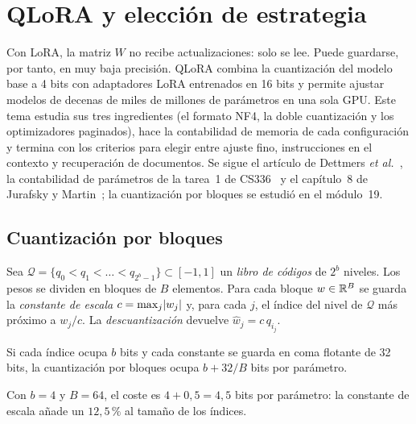 \chapter{QLoRA y elección de estrategia}
\label{tema:6}

Con LoRA, la matriz $W$ no recibe actualizaciones: solo se lee. Puede guardarse, por tanto, en muy baja precisión. QLoRA combina la cuantización del modelo base a 4 bits con adaptadores LoRA entrenados en 16 bits y permite ajustar modelos de decenas de miles de millones de parámetros en una sola GPU. Este tema estudia sus tres ingredientes (el formato NF4, la doble cuantización y los optimizadores paginados), hace la contabilidad de memoria de cada configuración y termina con los criterios para elegir entre ajuste fino, instrucciones en el contexto y recuperación de documentos. Se sigue el artículo de Dettmers \emph{et al.}~\cite[§3 y~§4]{dettmers}, la contabilidad de parámetros de la tarea~1 de CS336~\cite[§3.5]{cs336a1} y el capítulo~8 de Jurafsky y Martin~\cite{jm3}; la cuantización por bloques se estudió en el módulo~19.

\section{Cuantización por bloques}

\begin{definicion}\label{def:cuant-bloques}
Sea $\mathcal{Q}=\{q_0<q_1<\dots<q_{2^{b}-1}\}\subset[-1,1]$ un \emph{libro de códigos} de $2^{b}$ niveles. Los pesos se dividen en bloques de $B$ elementos. Para cada bloque $w\in\mathbb{R}^{B}$ se guarda la \emph{constante de escala} $c=\max_j\lvert w_j\rvert$ y, para cada $j$, el índice del nivel de $\mathcal{Q}$ más próximo a $w_j/c$. La \emph{descuantización} devuelve $\hat w_j=c\,q_{i_j}$.
\end{definicion}

\begin{proposicion}\label{prop:bits}
Si cada índice ocupa $b$ bits y cada constante se guarda en coma flotante de 32 bits, la cuantización por bloques ocupa $b+32/B$ bits por parámetro.
\end{proposicion}

Con $b=4$ y $B=64$, el coste es $4+0{,}5=4{,}5$ bits por parámetro: la constante de escala añade un $12{,}5\,\%$ al tamaño de los índices.

